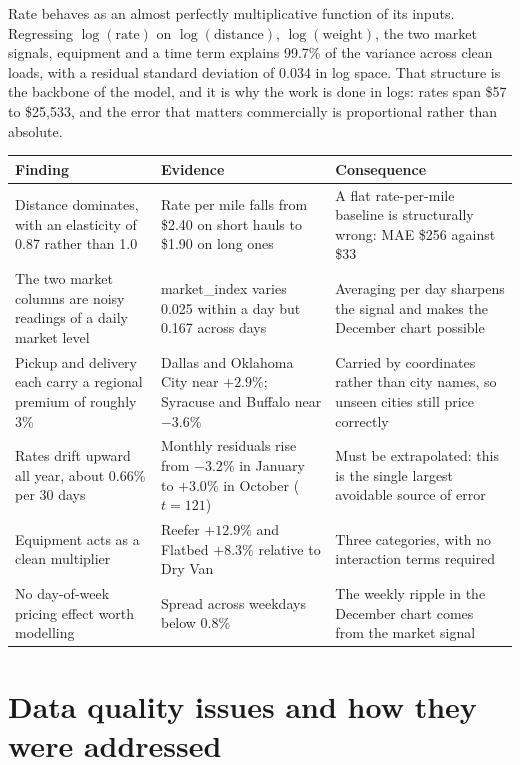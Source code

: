 \documentclass[11pt,a4paper]{article}
\begin{document}
Rate behaves as an almost perfectly multiplicative function of its inputs.
Regressing $\log(\text{rate})$ on $\log(\text{distance})$, $\log(\text{weight})$,
the two market signals, equipment and a time term explains 99.7\% of the
variance across clean loads, with a residual standard deviation of 0.034 in log
space. That structure is the backbone of the model, and it is why the work is
done in logs: rates span \$57 to \$25{,}533, and the error that matters
commercially is proportional rather than absolute.

\begin{table}[H]
\small
\begin{tabularx}{\textwidth}{L{0.30\textwidth}L{0.34\textwidth}X}
\toprule
\textbf{Finding} & \textbf{Evidence} & \textbf{Consequence} \\
\midrule
Distance dominates, with an elasticity of 0.87 rather than 1.0 & Rate per mile falls from \$2.40 on short hauls to \$1.90 on long ones & A flat rate-per-mile baseline is structurally wrong: MAE \$256 against \$33 \\
The two market columns are noisy readings of a daily market level & market\_index varies 0.025 within a day but 0.167 across days & Averaging per day sharpens the signal and makes the December chart possible \\
Pickup and delivery each carry a regional premium of roughly 3\% & Dallas and Oklahoma City near $+2.9\%$; Syracuse and Buffalo near $-3.6\%$ & Carried by coordinates rather than city names, so unseen cities still price correctly \\
Rates drift upward all year, about 0.66\% per 30 days & Monthly residuals rise from $-3.2\%$ in January to $+3.0\%$ in October ($t=121$) & Must be extrapolated: this is the single largest avoidable source of error \\
Equipment acts as a clean multiplier & Reefer $+12.9\%$ and Flatbed $+8.3\%$ relative to Dry Van & Three categories, with no interaction terms required \\
No day-of-week pricing effect worth modelling & Spread across weekdays below 0.8\% & The weekly ripple in the December chart comes from the market signal \\
\bottomrule
\end{tabularx}
\end{table}


\section{Data quality issues and how they were addressed}
\end{document}
